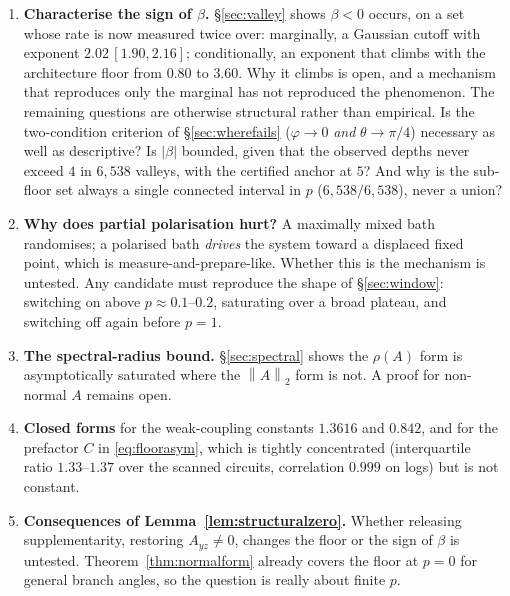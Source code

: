 \documentclass[11pt,a4paper]{article}
\theoremstyle{definition}
\theoremstyle{remark}
\newcommand{\opn}[1]{\left\lVert #1 \right\rVert_{2}}
\begin{document}
\begin{enumerate}
\item \textbf{Characterise the sign of $\beta$.} \S\ref{sec:valley} shows $\beta < 0$ occurs, on a set whose rate is now measured twice over: marginally, a Gaussian cutoff with exponent $2.02\,[1.90,2.16]$; conditionally, an exponent that climbs with the architecture floor from $0.80$ to $3.60$. Why it climbs is open, and a mechanism that reproduces only the marginal has not reproduced the phenomenon. The remaining questions are otherwise structural rather than empirical. Is the two-condition criterion of \S\ref{sec:wherefails} ($\varphi\to0$ \emph{and} $\theta\to\pi/4$) necessary as well as descriptive? Is $|\beta|$ bounded, given that the observed depths never exceed $4$ in $6{,}538$ valleys, with the certified anchor at $5$? And why is the sub-floor set always a single connected interval in $p$ ($6{,}538/6{,}538$), never a union?

\item \textbf{Why does partial polarisation hurt?} A maximally mixed bath randomises; a polarised bath \emph{drives} the system toward a displaced fixed point, which is measure-and-prepare-like. Whether this is the mechanism is untested. Any candidate must reproduce the shape of \S\ref{sec:window}: switching on above $p \approx 0.1$--$0.2$, saturating over a broad plateau, and switching off again before $p = 1$.

\item \textbf{The spectral-radius bound.} \S\ref{sec:spectral} shows the $\rho(A)$ form is asymptotically saturated where the $\opn{A}$ form is not. A proof for non-normal $A$ remains open.

\item \textbf{Closed forms} for the weak-coupling constants $1.3616$ and $0.842$, and for the prefactor $C$ in \eqref{eq:floorasym}, which is tightly concentrated (interquartile ratio $1.33$--$1.37$ over the scanned circuits, correlation $0.999$ on logs) but is not constant.

\item \textbf{Consequences of Lemma~\ref{lem:structuralzero}.} Whether releasing supplementarity, restoring $A_{yz} \neq 0$, changes the floor or the sign of $\beta$ is untested. Theorem~\ref{thm:normalform} already covers the floor at $p=0$ for general branch angles, so the question is really about finite $p$.
\end{enumerate}
\end{document}
